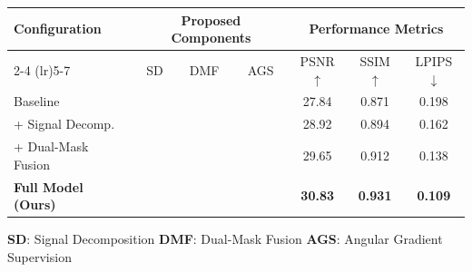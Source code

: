 \documentclass[border=10pt]{standalone}
\newcommand{\cmark}{\textcolor{accent}{\ding{51}}}
\newcommand{\xmark}{\textcolor{softgray!35}{\ding{55}}}
\begin{document}
\begin{minipage}{15cm}
\centering
\renewcommand{\arraystretch}{1.45}
\setlength{\tabcolsep}{10pt}
\begin{tabular}{l c c c c c c}
\toprule
\multirow{2}{*}{\textbf{Configuration}} & \multicolumn{3}{c}{\textbf{Proposed Components}} & \multicolumn{3}{c}{\textbf{Performance Metrics}} \\
\cmidrule(lr){2-4} \cmidrule(lr){5-7}
 & SD & DMF & AGS & PSNR$\uparrow$ & SSIM$\uparrow$ & LPIPS$\downarrow$ \\
\midrule
Baseline & \xmark & \xmark & \xmark & 27.84 & 0.871 & 0.198 \\
\quad + Signal Decomp. & \cmark & \xmark & \xmark & 28.92 & 0.894 & 0.162 \\
\quad + Dual-Mask Fusion & \cmark & \cmark & \xmark & 29.65 & 0.912 & 0.138 \\
\rowcolor{fullhl}
\textbf{Full Model (Ours)} & \cmark & \cmark & \cmark & \textbf{30.83} & \textbf{0.931} & \textbf{0.109} \\
\bottomrule
\end{tabular}

\vspace{8pt}
{\footnotesize\color{softgray}\textbf{SD}: Signal Decomposition \;\; \textbf{DMF}: Dual-Mask Fusion \;\; \textbf{AGS}: Angular Gradient Supervision}
\end{minipage}
\end{document}
